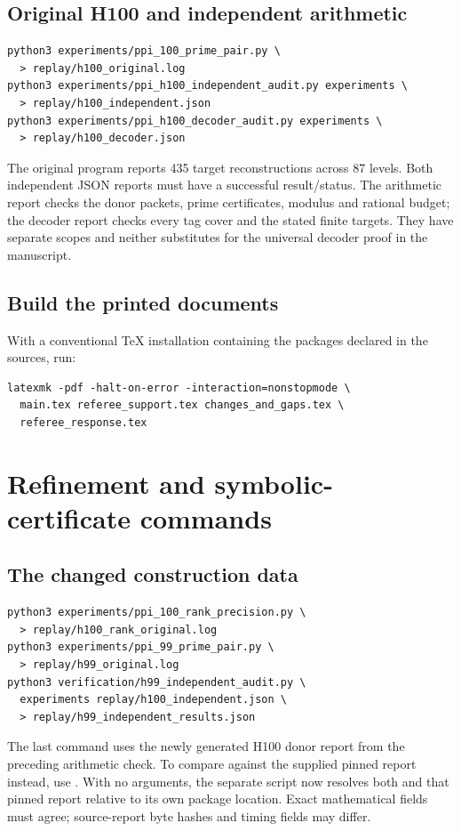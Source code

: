 \documentclass[10pt]{article}
\begin{document}
\subsection{Original H100 and independent arithmetic}
\begin{lstlisting}
python3 experiments/ppi_100_prime_pair.py \
  > replay/h100_original.log
python3 experiments/ppi_h100_independent_audit.py experiments \
  > replay/h100_independent.json
python3 experiments/ppi_h100_decoder_audit.py experiments \
  > replay/h100_decoder.json
\end{lstlisting}
The original program reports 435 target reconstructions across 87 levels.
Both independent JSON reports must have a successful result/status.
The arithmetic report checks the donor packets, prime certificates,
modulus and rational budget; the decoder report checks every tag cover
and the stated finite targets. They have separate scopes and neither
substitutes for the universal decoder proof in the manuscript.

\subsection{Build the printed documents}
With a conventional TeX installation containing the packages declared in
the sources, run:
\begin{lstlisting}
latexmk -pdf -halt-on-error -interaction=nonstopmode \
  main.tex referee_support.tex changes_and_gaps.tex \
  referee_response.tex
\end{lstlisting}


\newpage
\section{Refinement and symbolic-certificate commands}

\subsection{The changed construction data}
\begin{lstlisting}
python3 experiments/ppi_100_rank_precision.py \
  > replay/h100_rank_original.log
python3 experiments/ppi_99_prime_pair.py \
  > replay/h99_original.log
python3 verification/h99_independent_audit.py \
  experiments replay/h100_independent.json \
  > replay/h99_independent_results.json
\end{lstlisting}
The last command uses the newly generated H100 donor report from the
preceding arithmetic check. To compare against the supplied pinned
report instead, use . With no
arguments, the separate script now resolves both 
and that pinned report relative to its own package location.
Exact mathematical fields must agree; source-report byte hashes and
timing fields may differ.
\end{document}

